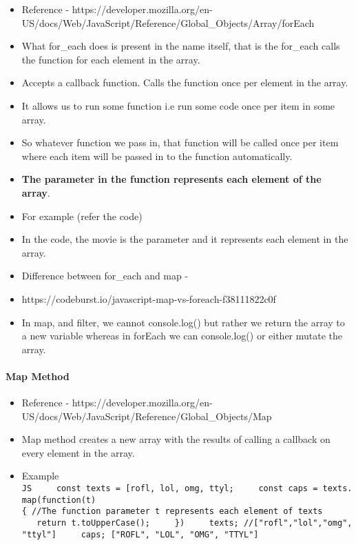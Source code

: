 \documentclass[
  paper=a4,
  ,captions=tableheading
]{scrartcl}
\providecommand{\tightlist}{%
  \setlength{\itemsep}{0pt}\setlength{\parskip}{0pt}}
\begin{document}
\begin{itemize}
\tightlist
\item
  Reference -
  https://developer.mozilla.org/en-US/docs/Web/JavaScript/Reference/Global\_Objects/Array/forEach
\item
  What for\_each does is present in the name itself, that is the
  for\_each calls the function for each element in the array.
\item
  Accepts a callback function. Calls the function once per element in
  the array.
\item
  It allows us to run some function i.e run some code once per item in
  some array.
\item
  So whatever function we pass in, that function will be called once per
  item where each item will be passed in to the function automatically.
\item
  \textbf{The parameter in the function represents each element of the
  array}.
\item
  For example (refer the code)
\item
  In the code, the movie is the parameter and it represents each element
  in the array.
\item
  Difference between for\_each and map -
\item
  https://codeburst.io/javascript-map-vs-foreach-f38111822c0f
\item
  In map, and filter, we cannot console.log() but rather we return the
  array to a new variable whereas in forEach we can console.log() or
  either mutate the array.
\end{itemize}

\hypertarget{map-method}{%
\paragraph{Map Method}\label{map-method}}

\begin{itemize}
\tightlist
\item
  Reference -
  https://developer.mozilla.org/en-US/docs/Web/JavaScript/Reference/Global\_Objects/Map
\item
  Map method creates a new array with the results of calling a callback
  on every element in the array.
\item
  Example
  \texttt{JS\ \ \ \ \ const\ texts\ =\ {[}\textquotesingle{}rofl\textquotesingle{},\ \textquotesingle{}lol\textquotesingle{},\ \textquotesingle{}omg\textquotesingle{},\ \textquotesingle{}ttyl\textquotesingle{}{]};\ \ \ \ \ const\ caps\ =\ texts.map(function(t)\{\ //The\ function\ parameter\ t\ represents\ each\ element\ of\ texts\ \ \ \ \ \ \ \ \ return\ t.toUpperCase();\ \ \ \ \ \})\ \ \ \ \ texts;\ //{[}"rofl","lol","omg","ttyl"{]}\ \ \ \ \ caps;\ {[}"ROFL",\ "LOL",\ "OMG",\ "TTYL"{]}}
\end{itemize}
\end{document}
